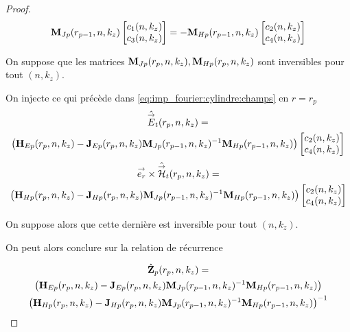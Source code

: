 \begin{proof}
      \begin{equation}
        \mathbf{M}_{Jp}(r_{p-1},n,k_z)
        \begin{bmatrix}
          c_1(n,k_z) \\
          c_3(n,k_z)
        \end{bmatrix}
        =
        -\mathbf{M}_{Hp}(r_{p-1},n,k_z)
        \begin{bmatrix}
          c_2(n,k_z) \\
          c_4(n,k_z)
        \end{bmatrix}
      \end{equation}

      On suppose que les matrices \(\mathbf{M}_{Jp}(r_p,n,k_z), \mathbf{M}_{Hp}(r_p,n,k_z)\) sont inversibles pour tout \((n,k_z)\).

      On injecte ce qui précède dans \eqref{eq:imp_fourier:cylindre:champs} en \(r = r_{p}\)
      \begin{multline}
        \hat{{\overset{\rightarrow}{E}}}_t(r_p,n,k_z) = \\
        \left(\mathbf{H}_{Ep}(r_{p},n,k_z) - \mathbf{J}_{Ep}(r_{p},n,k_z)\mathbf{M}_{Jp}(r_{p-1},n,k_z)^{-1}\mathbf{M}_{Hp}(r_{p-1},n,k_z)\right)
        \begin{bmatrix}
          c_2(n,k_z) \\
          c_4(n,k_z)
        \end{bmatrix}
      \end{multline}        
      \begin{multline}
        {\overset{\rightarrow}{e_r}}\times\hat{{\overset{\rightarrow}{\mathcal{H}}}}_t(r_p,n,k_z) = \\
        \left(\mathbf{H}_{Hp}(r_{p},n,k_z) - \mathbf{J}_{Hp}(r_{p},n,k_z)\mathbf{M}_{Jp}(r_{p-1},n,k_z)^{-1}\mathbf{M}_{Hp}(r_{p-1},n,k_z) \right)
        \begin{bmatrix}
          c_2(n,k_z) \\
          c_4(n,k_z)
        \end{bmatrix}
      \end{multline}

      On suppose alors que cette dernière est inversible pour tout \((n,k_z)\).

      On peut alors conclure sur la relation de récurrence

      \begin{multline}
        \hat{\mathbf{Z}}_{p}(r_p,n,k_z) =\\
          \left(\mathbf{H}_{Ep}(r_p,n,k_z) - \mathbf{J}_{Ep}(r_p,n,k_z)\mathbf{M}_{Jp}(r_{p-1},n,k_z)^{-1}\mathbf{M}_{Hp}(r_{p-1},n,k_z)\right) \\
          \left(\mathbf{H}_{Hp}(r_p,n,k_z) - \mathbf{J}_{Hp}(r_p,n,k_z)\mathbf{M}_{Jp}(r_{p-1},n,k_z)^{-1}\mathbf{M}_{Hp}(r_{p-1},n,k_z)\right)^{-1}
      \end{multline}


\end{proof}
